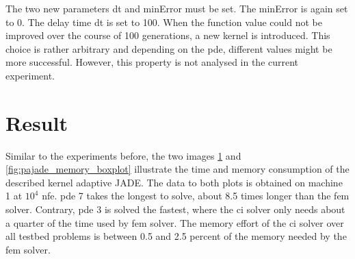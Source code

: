 \documentclass[./\jobname.tex]{subfiles}
\begin{document}
The two new parameters \gls{dt} and minError must be set. The minError is again set to 0. The delay time \gls{dt} is set to 100. When the function value could not be improved over the course of 100 generations, a new kernel is introduced. This choice is rather arbitrary and depending on the \gls{pde}, different values might be more successful. However, this property is not analysed in the current experiment.

\section{Result}
\label{chap:results_ex2}

Similar to the experiments before, the two images \ref{fig:pajade_time_boxplot} and \ref{fig:pajade_memory_boxplot} illustrate the time and memory consumption of the described kernel adaptive JADE. The data to both plots is obtained on machine 1 at $10^4$ \gls{nfe}. \gls{pde} 7 takes the longest to solve, about 8.5 times longer than the \gls{fem} solver. Contrary, \gls{pde} 3 is solved the fastest, where the \gls{ci} solver only needs about a quarter of the time used by \gls{fem} solver. The memory effort of the \gls{ci} solver over all testbed problems is between 0.5 and 2.5 percent of the memory needed by the \gls{fem} solver. 

\begin{figure}[H]
	\centering
	\noindent{}
	\label{fig:pajade_time_boxplot}
\end{figure}
\end{document}
